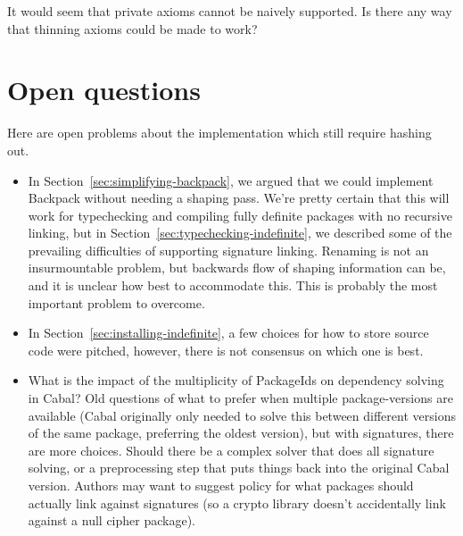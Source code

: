 \documentclass{article}
\begin{document}
It would seem that private axioms cannot be naively supported. Is
there any way that thinning axioms could be made to work?

\section{Open questions}\label{sec:open-questions}

Here are open problems about the implementation which still require
hashing out.

\begin{itemize}

    \item In Section~\ref{sec:simplifying-backpack}, we argued that we
        could implement Backpack without needing a shaping pass. We're
        pretty certain that this will work for typechecking and
        compiling fully definite packages with no recursive linking, but
        in Section~\ref{sec:typechecking-indefinite}, we described some
        of the prevailing difficulties of supporting signature linking.
        Renaming is not an insurmountable problem, but backwards flow of
        shaping information can be, and it is unclear how best to
        accommodate this.  This is probably the most important problem
        to overcome.

    \item In Section~\ref{sec:installing-indefinite}, a few choices for how to
        store source code were pitched, however, there is not consensus on which
        one is best.

    \item What is the impact of the multiplicity of PackageIds on
        dependency solving in Cabal?  Old questions of what to prefer
        when multiple package-versions are available (Cabal originally
        only needed to solve this between different versions of the same
        package, preferring the oldest version), but with signatures,
        there are more choices.  Should there be a complex solver that
        does all signature solving, or a preprocessing step that puts
        things back into the original Cabal version.  Authors may want
        to suggest policy for what packages should actually link against
        signatures (so a crypto library doesn't accidentally link
        against a null cipher package).

\end{itemize}



\end{document}
